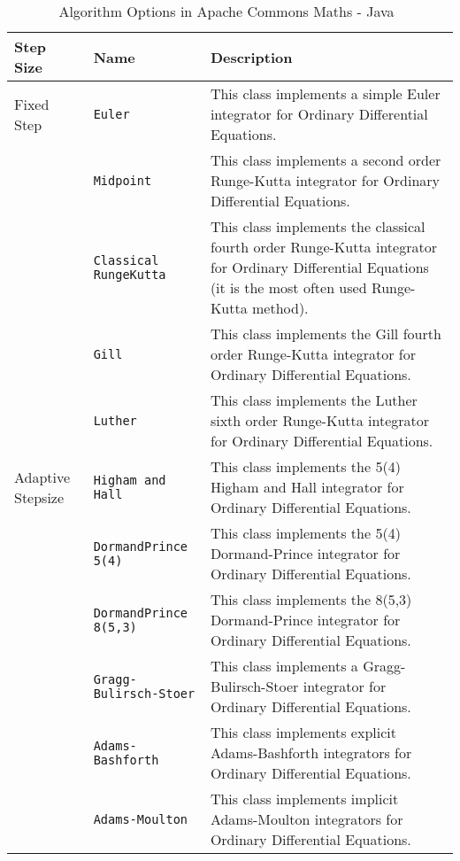 \begin{table}
\begin{tabular}{ p{} | p{} p{} }
	\textbf{Step Size} & \textbf{Name} & \textbf{Description} \\
	\toprule
	Fixed Step & \verb|Euler| & This class implements a simple Euler integrator for Ordinary Differential Equations.\\ \hline
	& \verb|Midpoint| & This class implements a second order Runge-Kutta integrator for Ordinary Differential Equations.\\ \hline
	& \verb|Classical RungeKutta| & This class implements the classical fourth order Runge-Kutta integrator for Ordinary Differential Equations (it is the most often used Runge-Kutta method).\\ \hline
	& \verb|Gill| & This class implements the Gill fourth order Runge-Kutta integrator for Ordinary Differential Equations.\\ \hline
	& \verb|Luther| & This class implements the Luther sixth order Runge-Kutta integrator for Ordinary Differential Equations.\\ \hline
	Adaptive Stepsize & \verb|Higham and Hall| & This class implements the 5(4) Higham and Hall integrator for Ordinary Differential Equations.\\ \hline
	& \verb|DormandPrince 5(4)| & This class implements the 5(4) Dormand-Prince integrator for Ordinary Differential Equations.\\ \hline
	& \verb|DormandPrince 8(5,3)| & This class implements the 8(5,3) Dormand-Prince integrator for Ordinary Differential Equations.\\ \hline
	& \verb|Gragg-Bulirsch-Stoer| & This class implements a Gragg-Bulirsch-Stoer integrator for Ordinary Differential Equations.\\ \hline
	& \verb|Adams-Bashforth| & This class implements explicit Adams-Bashforth integrators for Ordinary Differential Equations.\\ \hline
	& \verb|Adams-Moulton| & This class implements implicit Adams-Moulton integrators for Ordinary Differential Equations.\\
	\bottomrule	
\end{tabular}	
\caption{Algorithm Options in Apache Commons Maths - Java~\citep{apachefun}}	
\label{tab_algacm}
\end{table}

